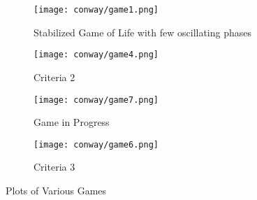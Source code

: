 \begin{figure}[tbh]
\begin{center}
    \begin{subfigure}[tbh]{0.475\textwidth}
    \begin{center}
    \texttt{[image: conway/game1.png]}
    \caption{ Stabilized Game of Life with few oscillating phases }
    \end{center}
    \end{subfigure}
\hfill
    \begin{subfigure}[tbh]{0.475\textwidth}
    \begin{center}
    \texttt{[image: conway/game4.png]}
    \caption{ Criteria 2 }
    \end{center}
    \end{subfigure}
\hfill
    \begin{subfigure}[tbh]{0.475\textwidth}
    \begin{center}
    \texttt{[image: conway/game7.png]}
    \caption{ Game in Progress }
    \end{center}
    \end{subfigure}
\hfill
    \begin{subfigure}[tbh]{0.475\textwidth}
    \begin{center}
    \texttt{[image: conway/game6.png]}
    \caption{ Criteria 3 }
    \end{center}
    \end{subfigure}
\hfill
\end{center}
\caption{Plots of Various Games \label{conway} }
\end{figure}

